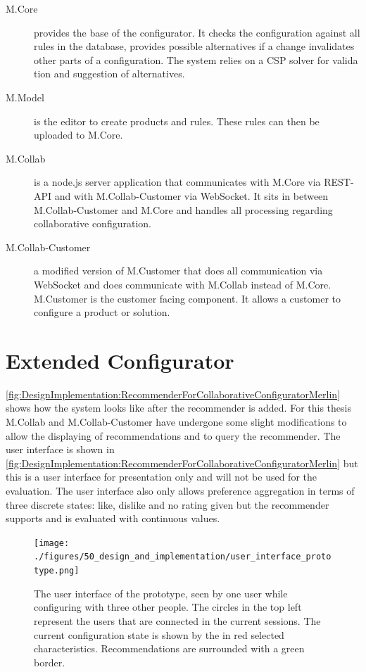 \begin{description}
    \item[M.Core] provides the base of the configurator. It checks the configuration against all rules in the database, provides possible alternatives if a change invalidates other parts of a configuration. The system relies on a CSP solver for valida tion and suggestion of alternatives.
    \item[M.Model] is the editor to create products and rules. These rules can then be uploaded to M.Core.
    \item[M.Collab] is a node.js server application that communicates with M.Core via REST-API and with M.Collab-Customer via WebSocket. It sits in between M.Collab-Customer and M.Core and handles all processing regarding collaborative configuration.
    \item[M.Collab-Customer] a modified version of M.Customer that does all communication via WebSocket and does communicate with M.Collab instead of M.Core. M.Customer is the customer facing component. It allows a customer to configure a product or solution.
\end{description}

\FloatBarrier

\section{Extended Configurator}
\label{subsec:DesignImplementation:ExtendedConfigurator}

\autoref{fig:DesignImplementation:RecommenderForCollaborativeConfiguratorMerlin} shows how the system looks like after the recommender is added. For this thesis M.Collab and M.Collab-Customer have undergone some slight modifications to allow the displaying of recommendations and to query the recommender. The user interface is shown in \autoref{fig:DesignImplementation:RecommenderForCollaborativeConfiguratorMerlin} but this is a user interface for presentation only and will not be used for the evaluation. The user interface also only allows preference aggregation in terms of three discrete states: like, dislike and no rating given but the recommender supports and is evaluated with continuous values.

\begin{figure}
    \centering
    \texttt{[image: ./figures/50\_design\_and\_implementation/user\_interface\_prototype.png]}
    \caption{The user interface of the prototype, seen by one user while configuring with three other people. The circles in the top left represent the users that are connected in the current sessions. The current configuration state is shown by the in red selected characteristics. Recommendations are surrounded with a green border.}
    \label{fig:DesignImplementation:UserInterface}
\end{figure}


